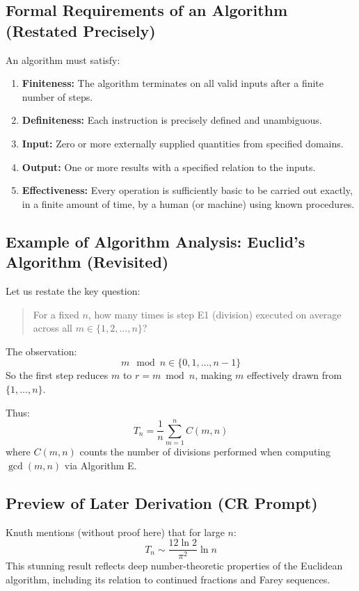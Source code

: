 \documentclass{article}
\begin{document}
\subsection*{Formal Requirements of an Algorithm (Restated Precisely)}

An algorithm must satisfy:

\begin{enumerate}[label=\textbf{(\arabic*)}]
    \item \textbf{Finiteness:} The algorithm terminates on all valid inputs after a finite number of steps.
    \item \textbf{Definiteness:} Each instruction is precisely defined and unambiguous.
    \item \textbf{Input:} Zero or more externally supplied quantities from specified domains.
    \item \textbf{Output:} One or more results with a specified relation to the inputs.
    \item \textbf{Effectiveness:} Every operation is sufficiently basic to be carried out exactly, in a finite amount of time, by a human (or machine) using known procedures.
\end{enumerate}

\subsection*{Example of Algorithm Analysis: Euclid’s Algorithm (Revisited)}

Let us restate the key question:
\begin{quote}
For a fixed $n$, how many times is step E1 (division) executed on average across all $m \in \{1, 2, \dots, n\}$?
\end{quote}

The observation:
\[
m \mod n \in \{0, 1, \dots, n-1\}
\]
So the first step reduces $m$ to $r = m \bmod n$, making $m$ effectively drawn from $\{1, \dots, n\}$.

Thus:
\[
T_n = \frac{1}{n} \sum_{m=1}^n C(m,n)
\]
where $C(m,n)$ counts the number of divisions performed when computing $\gcd(m,n)$ via Algorithm E.

\subsection*{Preview of Later Derivation (CR Prompt)}

Knuth mentions (without proof here) that for large $n$:
\[
T_n \sim \frac{12 \ln 2}{\pi^2} \ln n
\]
This stunning result reflects deep number-theoretic properties of the Euclidean algorithm, including its relation to continued fractions and Farey sequences.
\end{document}
